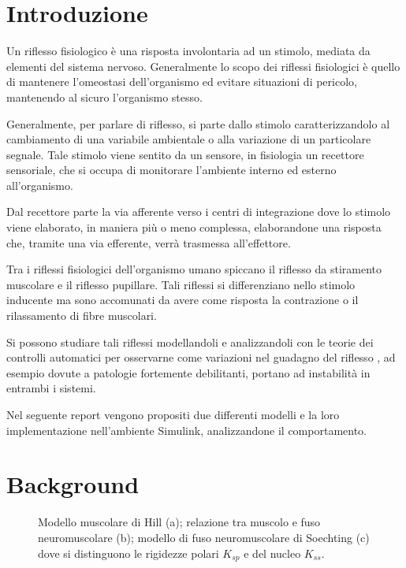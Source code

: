 \section{Introduzione}

Un riflesso fisiologico è una risposta involontaria ad un stimolo, mediata da elementi del sistema nervoso. Generalmente lo scopo dei riflessi fisiologici è quello di mantenere l'omeostasi dell'organismo ed evitare situazioni di pericolo, mantenendo al sicuro l'organismo stesso.

Generalmente, per parlare di riflesso, si parte dallo stimolo caratterizzandolo al cambiamento di una variabile ambientale o alla variazione di un particolare segnale. Tale stimolo viene sentito da un sensore, in fisiologia un recettore sensoriale, che si occupa di monitorare l'ambiente interno ed esterno all'organismo.

Dal recettore parte la via afferente verso i centri di integrazione dove lo stimolo viene elaborato, in maniera più o meno complessa, elaborandone una risposta che, tramite una via efferente, verrà trasmessa all'effettore.

Tra i riflessi fisiologici dell'organismo umano spiccano il riflesso da stiramento muscolare e il riflesso pupillare. Tali riflessi si differenziano nello stimolo inducente ma sono accomunati da avere come risposta la contrazione o il rilassamento di fibre muscolari. 

Si possono studiare tali riflessi modellandoli e analizzandoli con le teorie dei controlli automatici per osservarne come variazioni nel guadagno del riflesso , ad esempio dovute a patologie fortemente debilitanti, portano ad instabilità in entrambi i sistemi.

Nel seguente report vengono propositi due differenti modelli e la loro implementazione nell'ambiente Simulink, analizzandone il comportamento.

\section{Background}


\begin{figure}[t!]
	\centering
	\begin{subfigure}{0.33\linewidth}
		\centering
		\footnotesize{\def\svgwidth{0.9\linewidth}
			}
		\caption{}
		\label{fig:hill}
	\end{subfigure}\hfill
	\begin{subfigure}{0.33\linewidth}
		\centering
		\tiny{\def\svgwidth{0.8\linewidth}
			}
		\caption{}
	\end{subfigure}\hfill
	\begin{subfigure}{0.33\linewidth}
		\centering
		\footnotesize{\def\svgwidth{0.9\linewidth}
			}
		\caption{}
		\label{fig:soecthing}
	\end{subfigure}\hfill
	\caption{Modello muscolare di Hill (a); relazione tra muscolo e fuso neuromuscolare (b); modello di fuso neuromuscolare di Soechting (c) dove si distinguono le rigidezze polari $K_{sp}$ e del nucleo $K_{ss}$.}
	\label{fig:fuso}
\end{figure}


